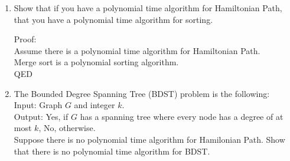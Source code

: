 \documentclass[12pt]{article}
\begin{document}
\begin{enumerate}
\item Show that if you have a polynomial time algorithm for Hamiltonian Path,
    that you have a polynomial time algorithm for sorting.

    Proof:\\
    Assume there is a polynomial time algorithm for Hamiltonian Path.\\
    Merge sort is a polynomial sorting algorithm.\\
    QED

\item The Bounded Degree Spanning Tree (BDST) problem is the following:\\
    Input: Graph $G$ and integer $k$.\\
    Output: Yes, if $G$ has a spanning tree where every node has a degree of at
    most $k$, No, otherwise.\\
    Suppose there is no polynomial time algorithm for Hamilonian Path. Show that
    there is no polynomial time algorithm for BDST.

\end{enumerate}
\end{document}
